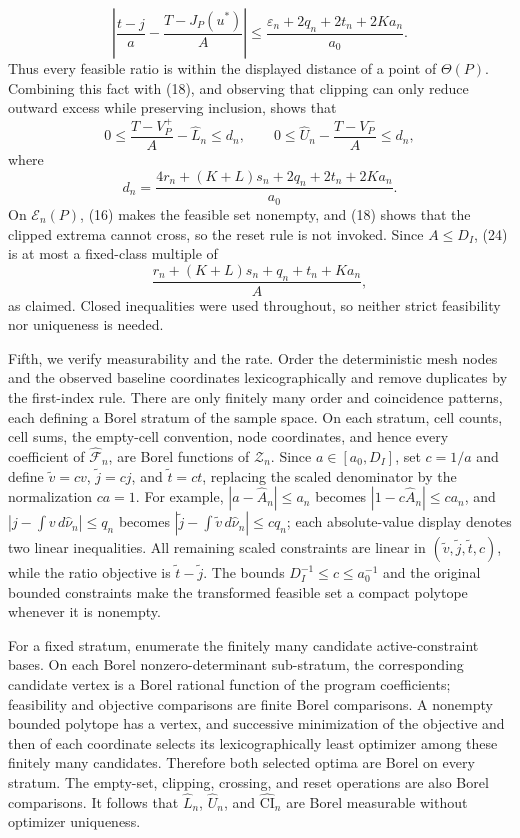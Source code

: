 \[
 \left|\frac{t-j}{a}-\frac{T-J_P(u^*)}{A}\right|
 \le \frac{\varepsilon_n+2q_n+2t_n+2Ka_n}{a_0}.                                \tag{23}
\]
Thus every feasible ratio is within the displayed distance of a point of \(\Theta(P)\).  Combining this fact with (18), and observing that clipping can only reduce outward excess while preserving inclusion, shows that
\[
 0\le \frac{T-V_P^+}{A}-\widehat L_n\le d_n,
 \qquad
 0\le \widehat U_n-\frac{T-V_P^-}{A}\le d_n,                                  \tag{24}
\]
where
\[
 d_n=\frac{4r_n+(K+L)s_n+2q_n+2t_n+2Ka_n}{a_0}.
\]
On \(\mathcal E_n(P)\), (16) makes the feasible set nonempty, and (18) shows that the clipped extrema cannot cross, so the reset rule is not invoked.  Since \(A\le D_I\), (24) is at most a fixed-class multiple of
\[
 \frac{r_n+(K+L)s_n+q_n+t_n+Ka_n}{A},                                           \tag{25}
\]
as claimed.  Closed inequalities were used throughout, so neither strict feasibility nor uniqueness is needed.

Fifth, we verify measurability and the rate.  Order the deterministic mesh nodes and the observed baseline coordinates lexicographically and remove duplicates by the first-index rule.  There are only finitely many order and coincidence patterns, each defining a Borel stratum of the sample space.  On each stratum, cell counts, cell sums, the empty-cell convention, node coordinates, and hence every coefficient of \(\widehat{\mathscr F}_n\), are Borel functions of \(\mathcal Z_n\).  Since \(a\in[a_0,D_I]\), set \(c=1/a\) and define \(\widetilde v=cv\), \(\widetilde j=cj\), and \(\widetilde t=ct\), replacing the scaled denominator by the normalization \(ca=1\).  For example, \(|a-\widehat A_n|\le a_n\) becomes \(|1-c\widehat A_n|\le ca_n\), and \(|j-\int v\,d\widehat\nu_n|\le q_n\) becomes \(|\widetilde j-\int\widetilde v\,d\widehat\nu_n|\le cq_n\); each absolute-value display denotes two linear inequalities.  All remaining scaled constraints are linear in \((\widetilde v,\widetilde j,\widetilde t,c)\), while the ratio objective is \(\widetilde t-\widetilde j\).  The bounds \(D_I^{-1}\le c\le a_0^{-1}\) and the original bounded constraints make the transformed feasible set a compact polytope whenever it is nonempty.

For a fixed stratum, enumerate the finitely many candidate active-constraint bases.  On each Borel nonzero-determinant sub-stratum, the corresponding candidate vertex is a Borel rational function of the program coefficients; feasibility and objective comparisons are finite Borel comparisons.  A nonempty bounded polytope has a vertex, and successive minimization of the objective and then of each coordinate selects its lexicographically least optimizer among these finitely many candidates.  Therefore both selected optima are Borel on every stratum.  The empty-set, clipping, crossing, and reset operations are also Borel comparisons.  It follows that \(\widehat L_n\), \(\widehat U_n\), and \(\widehat{\mathrm{CI}}_n\) are Borel measurable without optimizer uniqueness.

